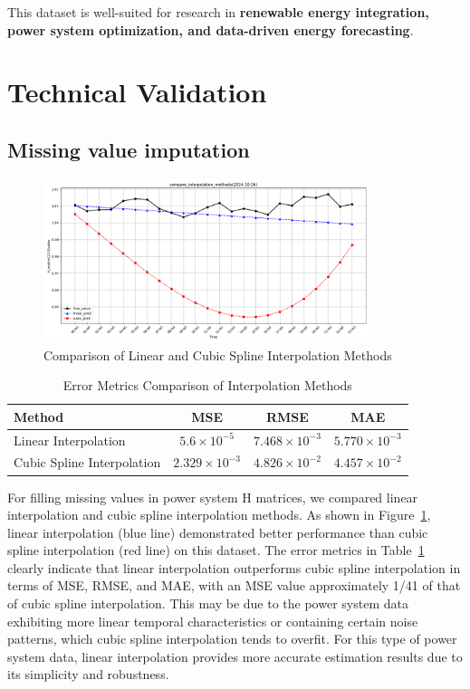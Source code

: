 \documentclass[12pt]{article}
\begin{document}
This dataset is well-suited for research in \textbf{renewable energy integration, power system optimization, and data-driven energy forecasting}.


\section*{Technical Validation}
\subsection*{Missing value imputation}
\begin{figure}[htbp]
    \centering
    \includegraphics[width=0.85\textwidth]{picture/interpolation.png}
    \caption{Comparison of Linear and Cubic Spline Interpolation Methods}
    \label{fig:interpolation_comparison_en}
\end{figure}

\begin{table}[htbp]
    \centering
    
    \label{tab:interpolation_errors_en}
    \begin{tabular}{lccc}
        \toprule
        \textbf{Method} & \textbf{MSE} & \textbf{RMSE} & \textbf{MAE} \\
        \midrule
        Linear Interpolation & $5.6 \times 10^{-5}$ & $7.468 \times 10^{-3}$ & $5.770 \times 10^{-3}$ \\
        Cubic Spline Interpolation & $2.329 \times 10^{-3}$ & $4.826 \times 10^{-2}$ & $4.457 \times 10^{-2}$ \\
        \bottomrule
    \end{tabular}
    \caption{Error Metrics Comparison of Interpolation Methods}
\end{table}

For filling missing values in power system H matrices, we compared linear interpolation and cubic spline interpolation methods. As shown in Figure~\ref{fig:interpolation_comparison_en}, linear interpolation (blue line) demonstrated better performance than cubic spline interpolation (red line) on this dataset. The error metrics in Table~\ref{tab:interpolation_errors_en} clearly indicate that linear interpolation outperforms cubic spline interpolation in terms of MSE, RMSE, and MAE, with an MSE value approximately 1/41 of that of cubic spline interpolation. This may be due to the power system data exhibiting more linear temporal characteristics or containing certain noise patterns, which cubic spline interpolation tends to overfit. For this type of power system data, linear interpolation provides more accurate estimation results due to its simplicity and robustness.
\end{document}
